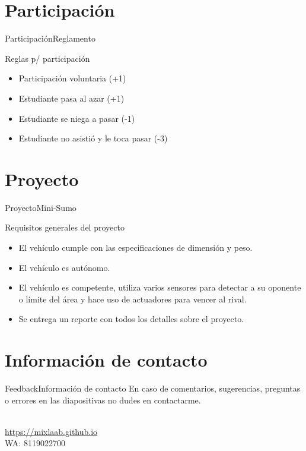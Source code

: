 \documentclass[10pt]{beamer}
\newcommand{\chref}[2]{%
  \href{#1}{{\usebeamercolor[bg]{Aalborg}#2}}%
}
\begin{document}
\section{Participación}
\begin{frame}{Participación}{Reglamento}
\begin{block}{Reglas p/ participación}
    \begin{itemize}
        \item Participación voluntaria (+1)
        \item Estudiante pasa al azar (+1)
        \item Estudiante se niega a pasar (-1)
        \item Estudiante no asistió y le toca pasar (-3)
    \end{itemize}
\end{block}

\end{frame}

\section{Proyecto}
\begin{frame}{Proyecto}{Mini-Sumo}
\begin{block}{Requisitos generales del proyecto}
    \begin{itemize}
        \item El vehículo cumple con las especificaciones de dimensión y peso.
        \item El vehículo es autónomo.
        \item El vehículo es competente, utiliza varios sensores para detectar a su oponente o límite del área y hace uso de actuadores para vencer al rival. 
        \item Se entrega un reporte con todos los detalles sobre el proyecto.
    \end{itemize}
\end{block}
\end{frame}

\section{Información de contacto}
\begin{frame}{Feedback}{Información de contacto}
En caso de comentarios, sugerencias, preguntas o errores en las diapositivas no dudes en contactarme.
  \begin{center}
    \insertauthor\\
    \chref{https://mixlaab.github.io}{https://mixlaab.github.io}\\
    WA: 8119022700\\
  \end{center}
\end{frame}

{\aauwavesbg%
\begin{frame}%
\end{frame}}
\end{document}
